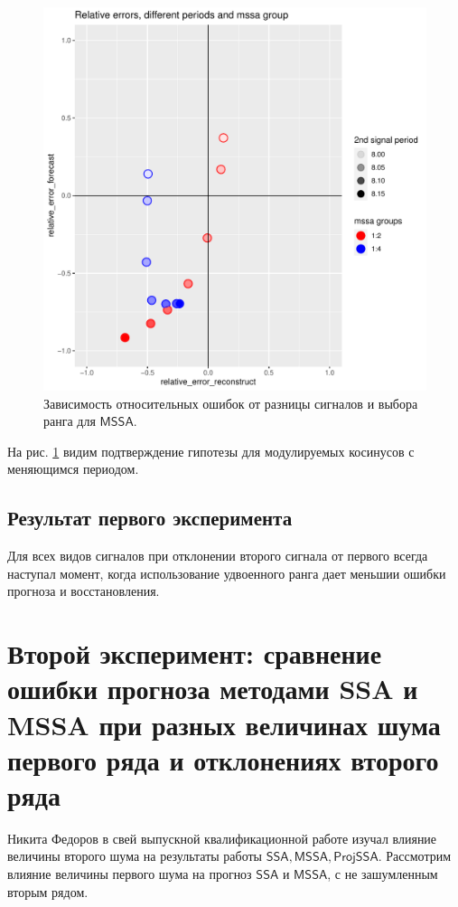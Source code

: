 \documentclass[specialist, substylefile = spbureport.rtx,
    subf,href,colorlinks=true, 12pt]{disser}
\newcommand{\SSA}{\mathsf{SSA}}
\newcommand{\MSSA}{\mathsf{MSSA}}
\newcommand{\ProjSSA}{\mathsf{ProjSSA}}
\begin{document}
        \begin{figure}[h]
            \centering
            \includegraphics[width=\textwidth]{experiment_1_expcos2.pdf}
            \caption{Зависимость относительных ошибок от разницы сигналов и выбора ранга для $\MSSA$.}
            \label{fig:exp1_expcos2}
        \end{figure}

        На рис. \ref{fig:exp1_expcos2} видим подтверждение гипотезы для модулируемых косинусов с меняющимся периодом.

    \subsection{Результат первого эксперимента}

        Для всех видов сигналов при отклонении второго сигнала от первого всегда наступал момент, когда использование удвоенного ранга дает меньшии ошибки прогноза и восстановления.


    \section{Второй эксперимент: сравнение ошибки прогноза методами SSA и MSSA при разных величинах шума первого ряда и отклонениях второго ряда}
        Никита Федоров в свей выпускной квалификационной работе изучал влияние величины второго шума на результаты работы $\SSA, \MSSA, \ProjSSA$. Рассмотрим влияние величины первого шума на прогноз $\SSA$ и $\MSSA$, с не зашумленным вторым рядом.
\end{document}

